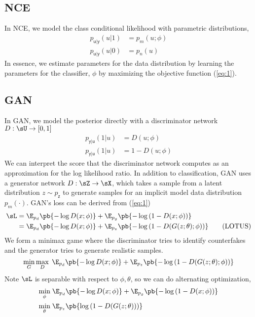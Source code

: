 \documentclass[11pt]{article}
\newcommand\ry{\ensuremath{\mathsf{y}}}
\newcommand\rz{\ensuremath{\mathsf{z}}}
\newcommand\ru{\ensuremath{\mathsf{u}}}
\begin{document}
\subsection{NCE}

In NCE, we model the class conditional likelihood with parametric distributions,
\begin{align*}
    p_{\ru|\ry}(u|1)
        &= p_m(u; \phi) \tag{model distribution} \\
    p_{\ru|\ry}(u|0)
        &= p_n(u) \tag{fixed noise distribution}
\end{align*}
In essence, we estimate parameters for the data distribution by learning the parameters for the classifier, $\phi$ by maximizing the objective function (\ref{eq:1}).


\subsection{GAN}

In GAN, we model the posterior directly with a discriminator network $D:\sU\to[0,1]$
\begin{align*}
    p_{\ry|\ru}(1|u)
        &= D(u; \phi) \\
    p_{\ry|\ru}(1|u)
        &= 1-D(u; \phi)
\end{align*}
We can interpret the score that the discriminator network computes as an approximation for the log likelihood ratio. In addition to classification, GAN uses a generator network $D:\sZ\to\sX$, which takes a sample from a latent distribution $z\sim p_{\rz}$ to generate samples for an implicit model data distribution $p_m(\cdot)$. GAN's loss can be derived from (\ref{eq:1})
\begin{align*}
    \sL
        &=  \E_{p_d}\pb{ -\log D(x;\phi) } +  \E_{p_g}\pb{ -\log \left( 1- D(x;\phi) \right) } \\
        &=  \E_{p_d}\pb{ -\log D(x;\phi) } +  \E_{p_z}\pb{ -\log \left( 1- D(G(z;\theta);\phi) \right) } \tag{LOTUS}
\end{align*}
We form a minimax game where the discriminator tries to identify counterfakes and the generator tries to generate realistic samples. 
\[
    \min_{G} \max_{D} \;  \E_{p_d}\pb{ -\log D(x;\phi) } +  \E_{p_z}\pb{ -\log \left( 1- D(G(z;\theta);\phi) \right) }    
\]
Note $\sL$ is separable with respect to $\phi,\theta$, so we can do alternating optimization, 
\begin{align}
    \label{eq:alternating_loss}
    \min_{\phi} \;
        &\E_{p_d}\pb{ -\log D(x;\phi) } + \E_{p_g}\pb{ -\log \left( 1- D(x;\phi) \right) }  \notag \\
    \min_{\theta} \;
        &\E_{p_z}\pb{ \log \left( 1- D(G(z;\theta)) \right) }
\end{align}










\printbibliography 
\end{document}
